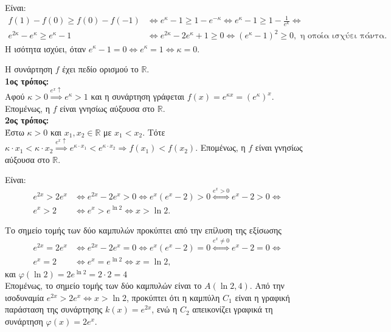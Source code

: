 \begin{alist}
\item Είναι:
\begin{align*}
f(1) - f(0) \ge f(0) - f(-1) &\Leftrightarrow e^\kappa - 1 \ge 1 - e^{-\kappa} \Leftrightarrow e^\kappa - 1 \ge 1 - \frac{1}{e^\kappa} \Leftrightarrow \\
e^{2\kappa} - e^\kappa \ge e^\kappa - 1 &\Leftrightarrow e^{2\kappa} - 2e^\kappa + 1 \ge 0 \Leftrightarrow (e^\kappa - 1)^2 \ge 0, \text{ η οποία ισχύει πάντα.}
\end{align*}
Η ισότητα ισχύει, όταν $e^\kappa - 1 = 0 \Leftrightarrow e^\kappa = 1 \Leftrightarrow \kappa = 0$.
\item Η συνάρτηση $f$ έχει πεδίο ορισμού το $\mathbb{R}$. \\
\textbf{1ος τρόπος:} \\
Αφού $\kappa > 0 \overset{e^x \uparrow}{\Longrightarrow} e^\kappa > 1$ και η συνάρτηση γράφεται $f(x) = e^{\kappa x} = (e^\kappa)^x$. Επομένως, η $f$ είναι γνησίως αύξουσα στο $\mathbb{R}$. \\
\textbf{2ος τρόπος:} \\
Έστω $\kappa > 0$ και $x_1, x_2 \in \mathbb{R}$ με $x_1 < x_2$.
Τότε $\kappa \cdot x_1 < \kappa \cdot x_2 \overset{e^x \uparrow}{\Longrightarrow} e^{\kappa\cdot x_1} < e^{\kappa\cdot x_2} \Rightarrow f(x_1) < f(x_2)$. Επομένως, η $f$ είναι γνησίως αύξουσα στο $\mathbb{R}$.
\item 
\begin{rlist}
\item Είναι:
\begin{align*}
e^{2x} > 2e^x &\Leftrightarrow e^{2x} - 2e^x > 0 \Leftrightarrow e^x(e^x - 2) > 0 \overset{e^x > 0}{\Longleftrightarrow} e^x - 2 > 0 \Leftrightarrow \\
e^x > 2 &\Leftrightarrow e^x > e^{\ln 2} \Leftrightarrow x > \ln 2.
\end{align*}
\item Το σημείο τομής των δύο καμπυλών προκύπτει από την επίλυση της εξίσωσης
\begin{align*}
e^{2x} = 2e^x &\Leftrightarrow e^{2x} - 2e^x = 0 \Leftrightarrow e^x(e^x - 2) = 0 \overset{e^x \ne 0}{\Longleftrightarrow} e^x - 2 = 0 \Leftrightarrow \\
e^x = 2 &\Leftrightarrow e^x = e^{\ln 2} \Leftrightarrow x = \ln 2,
\end{align*}
και $\varphi(\ln 2) = 2e^{\ln 2} = 2\cdot 2 = 4$ \\
Επομένως, το σημείο τομής των δύο καμπυλών είναι το $A(\ln 2, 4)$.
Από την ισοδυναμία $e^{2x} > 2e^x \Leftrightarrow x > \ln 2$, προκύπτει ότι η καμπύλη $C_1$ είναι η γραφική παράσταση της συνάρτησης $k(x) = e^{2x}$, ενώ η $C_2$ απεικονίζει γραφικά τη συνάρτηση $\varphi(x) = 2e^x$.
\end{rlist}
\end{alist}

